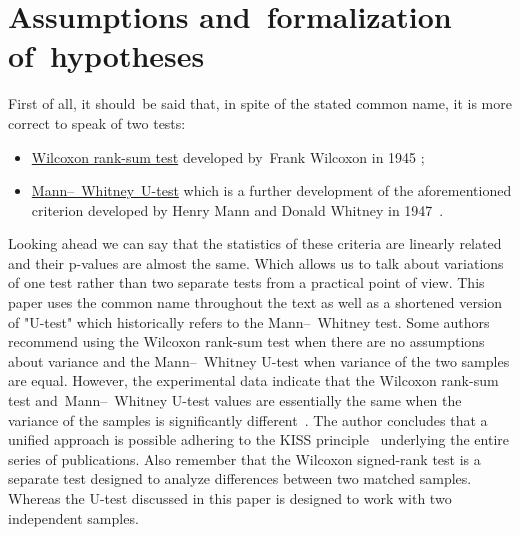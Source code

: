 \documentclass[]{scrreprt}
\begin{document}
\section{Assumptions and~formalization of~hypotheses}
First of all, it should~be said that, in spite of the stated common name, it is more correct to speak of two tests:
\begin{itemize}
	\item \href{http://www.machinelearning.ru/wiki/index.php?title=Критерий_Уилкоксона_двухвыборочный}{Wilcoxon rank-sum test} developed by~Frank Wilcoxon in 1945 \cite{MLRU:Wilcoxon-test};
	\item \href{http://www.machinelearning.ru/wiki/index.php?title=Критерий_Уилкоксона-Манна"--~Уитни}{Mann--~Whitney~U-test} which is a further development of the aforementioned criterion developed by Henry Mann and Donald Whitney in 1947~\cite{MLRU:Mann-Whitney}.
\end{itemize}
Looking ahead we can say that the statistics of these criteria are linearly related and their p-values are almost the same. Which allows us to talk about variations of one test rather than two separate tests from a practical point of view. This paper uses the common name throughout the text as well as a shortened version of "U-test" which historically refers to the Mann--~Whitney test. Some authors\cite{Kobzarq-prikl-mathstat} recommend using the Wilcoxon rank-sum test when there are no assumptions about variance and the Mann--~Whitney U-test when variance of the two samples are equal. However, the experimental data indicate that the Wilcoxon rank-sum test and~Mann--~Whitney U-test values are essentially the same when the variance of the samples is significantly different~\cite{MLRU:Mann-Whitney}. The author concludes that a unified approach is possible adhering to the KISS principle~\cite{KISS-principle} underlying the entire series of publications. Also remember that the Wilcoxon signed-rank test is a separate test designed to analyze differences between two matched samples. Whereas the U-test discussed in this paper is designed to work with two independent samples.
\end{document}
